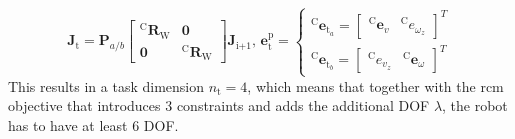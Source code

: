 \begin{equation}
    \mathbf{J}_\text{t} = \mathbf{P}_{a/b} \begin{bmatrix}^\text{C}\mathbf{R}_\text{W} & \mathbf{0} \\ \mathbf{0} & ^\text{C}\mathbf{R}_\text{W}\end{bmatrix}\mathbf{J}_\text{i+1},\,
    \mathbf{e}^\text{p}_\text{t} = 
    \begin{cases}
        ^\text{C}\mathbf{e}_{\text{t}_a}=\begin{bmatrix}^\text{C}\mathbf{e}_v & ^\text{C}e_{\omega_z} \end{bmatrix}^T \\
        ^\text{C}\mathbf{e}_{\text{t}_b}=\begin{bmatrix}^\text{C}e_{v_z} & ^\text{C}\mathbf{e}_{\omega} \end{bmatrix}^T
    \end{cases}
\end{equation}
This results in a task dimension $n_\text{t} = 4$, which means that together with the \acrshort{rcm} objective that introduces 3 constraints and adds the additional DOF $\lambda$, the robot has to have at least 6 DOF.

